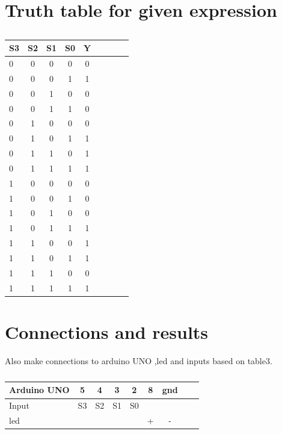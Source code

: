 \documentclass[10pt, a4paper]{article}
\begin{document}
\section{Truth table for given expression}
\begin{table}[htbp]
 \begin{center}
    \begin{tabular}{|l|c|c|c|c|c|c|c|c} \hline \textbf{S3}
  & \textbf{S2} & \textbf{S1} & \textbf{S0}& \textbf{Y} \\
 \hline
        0&0&0&0&0 \\
        \hline
        0&0&0&1&1 \\
        \hline
        0&0&1&0&0 \\
        \hline
        0&0&1&1&0 \\
        \hline
        0&1&0&0&0 \\
        \hline
        0&1&0&1&1 \\
        \hline
        0&1&1&0&1 \\
        \hline
        0&1&1&1&1 \\
        \hline
        1&0&0&0&0 \\
        \hline
        1&0&0&1&0 \\
        \hline
        1&0&1&0&0 \\
        \hline
        1&0&1&1&1 \\
        \hline
        1&1&0&0&1 \\
        \hline
        1&1&0&1&1 \\
        \hline
        1&1&1&0&0 \\
        \hline
        1&1&1&1&1 \\
        \hline
\end{tabular}   
\end{center}
\caption{\label{table:dummytable} }
\end{table}







\section{Connections and results}



Also make connections to arduino UNO ,led and inputs based on table3. 

\begin{table}[htbp]
 \begin{center}
    \begin{tabular}{|l|c|c|c|c|c|c|c|c} \hline \textbf{Arduino UNO}
  & \textbf{5} & \textbf{4} & \textbf{3}& \textbf{2}& \textbf{8}& \textbf{gnd} \\
 \hline
Input&S3&S2&S1&S0&&\\ \hline
led&&&&&+&- \\ \hline
\end{tabular}   
\end{center}
\caption{\label{table:dummytable} }
\end{table}
\end{document}
